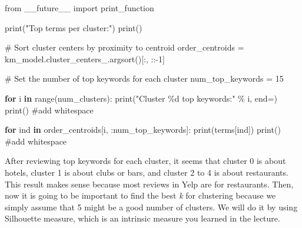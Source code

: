 \documentclass[
  letterpaper,
]{scrbook}
\newenvironment{Shaded}{\begin{snugshade}}{\end{snugshade}}
\newcommand{\BuiltInTok}[1]{\textcolor[rgb]{0.00,0.23,0.31}{#1}}
\newcommand{\CommentTok}[1]{\textcolor[rgb]{0.37,0.37,0.37}{#1}}
\newcommand{\ControlFlowTok}[1]{\textcolor[rgb]{0.00,0.23,0.31}{\textbf{#1}}}
\newcommand{\DecValTok}[1]{\textcolor[rgb]{0.68,0.00,0.00}{#1}}
\newcommand{\ImportTok}[1]{\textcolor[rgb]{0.00,0.46,0.62}{#1}}
\newcommand{\KeywordTok}[1]{\textcolor[rgb]{0.00,0.23,0.31}{\textbf{#1}}}
\newcommand{\NormalTok}[1]{\textcolor[rgb]{0.00,0.23,0.31}{#1}}
\newcommand{\OperatorTok}[1]{\textcolor[rgb]{0.37,0.37,0.37}{#1}}
\newcommand{\SpecialCharTok}[1]{\textcolor[rgb]{0.37,0.37,0.37}{#1}}
\newcommand{\StringTok}[1]{\textcolor[rgb]{0.13,0.47,0.30}{#1}}
\begin{document}
\begin{Shaded}
\begin{Highlighting}[]
\ImportTok{from}\NormalTok{ \_\_future\_\_ }\ImportTok{import}\NormalTok{ print\_function}

\BuiltInTok{print}\NormalTok{(}\StringTok{"Top terms per cluster:"}\NormalTok{)}
\BuiltInTok{print}\NormalTok{()}

\CommentTok{\# Sort cluster centers by proximity to centroid}
\NormalTok{order\_centroids }\OperatorTok{=}\NormalTok{ km\_model.cluster\_centers\_.argsort()[:, ::}\OperatorTok{{-}}\DecValTok{1}\NormalTok{]}

\CommentTok{\# Set the number of top keywords for each cluster}
\NormalTok{num\_top\_keywords }\OperatorTok{=} \DecValTok{15}

\ControlFlowTok{for}\NormalTok{ i }\KeywordTok{in} \BuiltInTok{range}\NormalTok{(num\_clusters):}
    \BuiltInTok{print}\NormalTok{(}\StringTok{"Cluster }\SpecialCharTok{\%d}\StringTok{ top keywords:"} \OperatorTok{\%}\NormalTok{ i, end}\OperatorTok{=}\StringTok{\textquotesingle{}\textquotesingle{}}\NormalTok{)}
    \BuiltInTok{print}\NormalTok{() }\CommentTok{\#add whitespace}
    
    \ControlFlowTok{for}\NormalTok{ ind }\KeywordTok{in}\NormalTok{ order\_centroids[i, :num\_top\_keywords]: }
        \BuiltInTok{print}\NormalTok{(terms[ind])}
    \BuiltInTok{print}\NormalTok{() }\CommentTok{\#add whitespace}
\end{Highlighting}
\end{Shaded}

After reviewing top keywords for each cluster, it seems that cluster 0
is about hotels, cluster 1 is about clubs or bars, and cluster 2 to 4 is
about restaurants. This result makes sense because most reviews in Yelp
are for restaurants. Then, now it is going to be important to find the
best \emph{k} for clustering because we simply assume that 5 might be a
good number of clusters. We will do it by using Silhouette measure,
which is an intrinsic measure you learned in the lecture.
\end{document}
